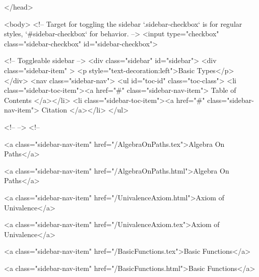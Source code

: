   
</head>




  <body>
    <!-- Target for toggling the sidebar `.sidebar-checkbox` is for regular
     styles, `#sidebar-checkbox` for behavior. -->
<input type="checkbox" class="sidebar-checkbox" id="sidebar-checkbox">

<!-- Toggleable sidebar -->
<div class="sidebar" id="sidebar">
  <div class="sidebar-item" >
    <p style="text-decoration:left">Basic Types</p>
  </div>
  <nav class="sidebar-nav">
    <ul id="toc-id" class="toc-class">
  <li class="sidebar-toc-item"><a href="#" class="sidebar-nav-item"> Table of Contents </a></li>
  <li class="sidebar-toc-item"><a href="#" class="sidebar-nav-item"> Citation </a></li>
</ul>


    <!--  -->
    <!-- 
      
    
      
    
      
    
      
        
      
    
      
        
          <a class="sidebar-nav-item" href="/AlgebraOnPaths.tex">Algebra On Paths</a>
        
      
    
      
        
          <a class="sidebar-nav-item" href="/AlgebraOnPaths.html">Algebra On Paths</a>
        
      
    
      
        
          <a class="sidebar-nav-item" href="/UnivalenceAxiom.html">Axiom of Univalence</a>
        
      
    
      
        
          <a class="sidebar-nav-item" href="/UnivalenceAxiom.tex">Axiom of Univalence</a>
        
      
    
      
        
          <a class="sidebar-nav-item" href="/BasicFunctions.tex">Basic Functions</a>
        
      
    
      
        
          <a class="sidebar-nav-item" href="/BasicFunctions.html">Basic Functions</a>
        
      
    
      
        
